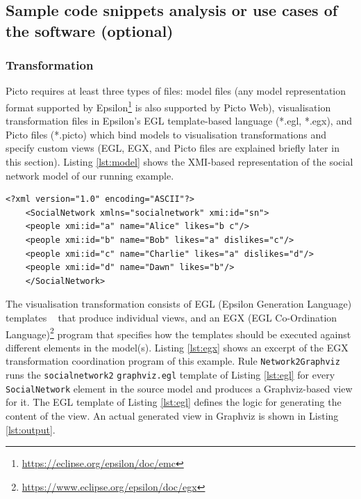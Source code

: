 \documentclass[preprint,12pt, a4paper]{elsarticle}
\begin{document}
\subsection{Sample code snippets analysis or use cases of the software (optional)}

\subsubsection{Transformation}
\label{sec:transformation}
Picto requires at least three types of files: model files (any model representation format supported by Epsilon\footnote{\url{https://eclipse.org/epsilon/doc/emc}} is also supported by Picto Web), visualisation transformation files in Epsilon's EGL template-based language (*.egl, *.egx), and Picto files (*.picto) which bind models to visualisation transformations and specify custom views (EGL, EGX, and Picto files are explained briefly later in this section). Listing \ref{lst:model} shows the XMI-based representation of the social network model of our running example. 

\begin{lstlisting}[firstnumber=1,style=model,caption={A social network model as the input file for the lazy transformation. The format of the ids is simplified.},label=lst:model,float]
	<?xml version="1.0" encoding="ASCII"?>
	<SocialNetwork xmlns="socialnetwork" xmi:id="sn">
	<people xmi:id="a" name="Alice" likes="b c"/>
	<people xmi:id="b" name="Bob" likes="a" dislikes="c"/>
	<people xmi:id="c" name="Charlie" likes="a" dislikes="d"/>
	<people xmi:id="d" name="Dawn" likes="b"/>
	</SocialNetwork>
\end{lstlisting}

The visualisation transformation consists of EGL (Epsilon Generation Language) templates ~\cite{rose2008egl} that produce individual views, and an EGX (EGL Co-Ordination Language)\footnote{\url{https://www.eclipse.org/epsilon/doc/egx}} program that specifies how the templates should be executed against different elements in the model(s). Listing \ref{lst:egx} shows an excerpt of the EGX transformation coordination program of this example. Rule \texttt{Network2Graphviz} runs the \texttt{socialnetwork2} \texttt{graphviz.egl} template of Listing \ref{lst:egl} for every \texttt{SocialNetwork} element in the source model and produces a Graphviz-based view for it. The EGL template of Listing \ref{lst:egl} defines the logic for generating the content of the view. An actual generated view in Graphviz is shown in Listing \ref{lst:output}. 
\end{document}
